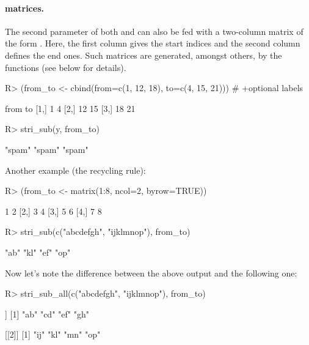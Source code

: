 \documentclass[nojss]{jss}
\begin{document}
\paragraph{ matrices.}
The second parameter of both  and 
can also be fed with a two-column matrix
of the form . Here, the first column
gives the start indices and the second column defines the end ones.
Such matrices are generated, amongst others, by the 
functions (see below for details).

\begin{Schunk}
\begin{Sinput}
R> (from_to <- cbind(from=c(1, 12, 18), to=c(4, 15, 21))) # +optional labels
\end{Sinput}
\begin{Soutput}
     from to
[1,]    1  4
[2,]   12 15
[3,]   18 21
\end{Soutput}
\begin{Sinput}
R> stri_sub(y, from_to)
\end{Sinput}
\begin{Soutput}
[1] "spam" "spam" "spam"
\end{Soutput}
\end{Schunk}


\noindent Another example (the recycling rule):

\begin{Schunk}
\begin{Sinput}
R> (from_to <- matrix(1:8, ncol=2, byrow=TRUE))
\end{Sinput}
\begin{Soutput}
     [,1] [,2]
[1,]    1    2
[2,]    3    4
[3,]    5    6
[4,]    7    8
\end{Soutput}
\begin{Sinput}
R> stri_sub(c("abcdefgh", "ijklmnop"), from_to)
\end{Sinput}
\begin{Soutput}
[1] "ab" "kl" "ef" "op"
\end{Soutput}
\end{Schunk}

\noindent
Now let's note the difference between the above output and the following one:

\begin{Schunk}
\begin{Sinput}
R> stri_sub_all(c("abcdefgh", "ijklmnop"), from_to)
\end{Sinput}
\begin{Soutput}
[[1]]
[1] "ab" "cd" "ef" "gh"

[[2]]
[1] "ij" "kl" "mn" "op"
\end{Soutput}
\end{Schunk}
\end{document}
